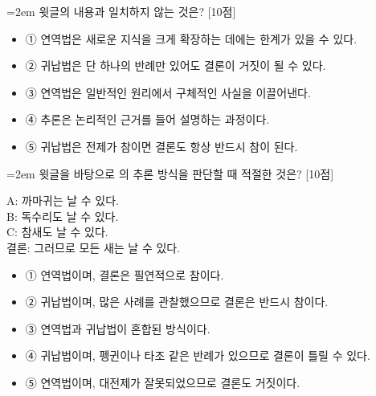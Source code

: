 \documentclass[11pt,a4paper]{article}
\newcommand{\qnum}[1]{%
  \tikz[baseline=(num.base)]{%
    \node[circle, fill=numCircle, text=white, inner sep=0pt,
          minimum size=18pt, font=\small\bfseries] (num) {#1};%
  }%
}
\newcommand{\pts}[1]{%
  \hfill\textcolor{ptsBadge}{[#1점]}%
}
\begin{document}
\begin{minipage}{\columnwidth}
{\hangindent=2em
\qnum{41}\enspace 윗글의 내용과 일치하지 않는 것은? \pts{10}
\par}

\vspace{3mm}
\begin{itemize}[leftmargin=2.5em, labelsep=0.3em, label={}, itemsep=4pt, parsep=1pt, topsep=0pt]
  \item ① 연역법은 새로운 지식을 크게 확장하는 데에는 한계가 있을 수 있다.
  \item ② 귀납법은 단 하나의 반례만 있어도 결론이 거짓이 될 수 있다.
  \item ③ 연역법은 일반적인 원리에서 구체적인 사실을 이끌어낸다.
  \item ④ 추론은 논리적인 근거를 들어 설명하는 과정이다.
  \item ⑤ 귀납법은 전제가 참이면 결론도 항상 반드시 참이 된다.
\end{itemize}
\end{minipage}
\vspace{4mm}

\vspace{4mm}
\begin{minipage}{\columnwidth}
{\hangindent=2em
\qnum{42}\enspace 윗글을 바탕으로 의 추론 방식을 판단할 때 적절한 것은? \pts{10}
\par}

\vspace{3mm}
\begin{tcolorbox}[bogi]
A: 까마귀는 날 수 있다. \\{}
B: 독수리도 날 수 있다. \\{}
C: 참새도 날 수 있다. \\{}
결론: 그러므로 모든 새는 날 수 있다.
\end{tcolorbox}
\vspace{3mm}
\begin{itemize}[leftmargin=2.5em, labelsep=0.3em, label={}, itemsep=4pt, parsep=1pt, topsep=0pt]
  \item ① 연역법이며, 결론은 필연적으로 참이다.
  \item ② 귀납법이며, 많은 사례를 관찰했으므로 결론은 반드시 참이다.
  \item ③ 연역법과 귀납법이 혼합된 방식이다.
  \item ④ 귀납법이며, 펭귄이나 타조 같은 반례가 있으므로 결론이 틀릴 수 있다.
  \item ⑤ 연역법이며, 대전제가 잘못되었으므로 결론도 거짓이다.
\end{itemize}
\end{minipage}
\vspace{4mm}
\end{document}
